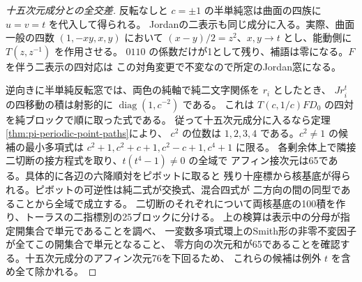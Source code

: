 \begin{proof}[十五次元成分との全交差]
反転なしと $c=\pm1$ の半単純窓は曲面の四族に $u=v=t$ を代入して得られる。
Jordanの二表示も同じ成分に入る。実際、曲面一般の四数 $(1,-xy,x,y)$ において
$(x-y)/2=z^2$、$x,y\to t$ とし、能動側に $T(z,z^{-1})$ を作用させる。
$0110$ の係数だけが1として残り、補語は零になる。$F$ を伴う二表示の四対応は
この対角変更で不変なので所定のJordan窓になる。

逆向きに半単純反転窓では、両色の純軸で純二文字関係を $r_i$ としたとき、
$Jr_i^t$ の四移動の積は射影的に $\operatorname{diag}(1,c^{-2})$ である。
これは $T(c,1/c)FD_0$ の四対を純ブロックで順に取った式である。
従って十五次元成分に入るなら定理\ref{thm:pi-periodic-point-paths}により、
$c^2$ の位数は $1,2,3,4$ である。$c^2\ne1$ の候補の最小多項式は
$c^2+1,c^2+c+1,c^2-c+1,c^4+1$ に限る。
各剰余体上で隣接二切断の接方程式を取り、$t(t^4-1)\ne0$ の全域で
アフィン接次元は65である。具体的に各辺の六降順対をピボットに取ると
残り十座標から核基底が得られる。ピボットの可逆性は純二式が交換式、混合四式が
二方向の間の同型であることから全域で成立する。
二切断のそれぞれについて両核基底の100積を作り、トーラスの二指標別の25ブロックに分ける。
上の検算は表示中の分母が指定開集合で単元であることを調べ、
一変数多項式環上のSmith形の非零不変因子が全てこの開集合で単元となること、
零方向の次元和が65であることを確認する。十五次元成分のアフィン次元76を下回るため、
これらの候補は例外 $t$ を含め全て除かれる。
\end{proof}
